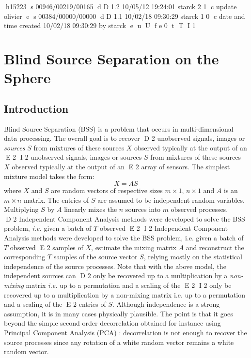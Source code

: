h15223
s 00946/00219/00165
d D 1.2 10/05/12 19:24:01 starck 2 1
c update olivier
e
s 00384/00000/00000
d D 1.1 10/02/18 09:30:29 starck 1 0
c date and time created 10/02/18 09:30:29 by starck
e
u
U
f e 0
t
T
I 1


\chapter{Blind Source Separation on the Sphere}
\label{ch_mrs_ica}

\section{Introduction}

Blind Source Separation (BSS) is a problem that occurs in multi-dimensional data processing. The overall goal is to recover 
D 2
unobserved signals, images or \emph{sources} $S$ from mixtures of these sources $X$ observed typically at the output of an 
E 2
I 2
unobserved signals, images or sources $S$ from mixtures of these sources $X$ observed typically at the output of an 
E 2
array of sensors. The simplest mixture model takes the form:
\begin{equation}\label{model0}
X = A S
\end{equation}
where $X$ and $S$ are random vectors of respective sizes $m \times 1$, $n \times 1$ and $A$ is an $m \times n$ matrix. The 
entries of $S$ are assumed to be independent random variables. Multiplying $S$ by $A$ linearly mixes the $n$ sources into 
$m$ observed processes. \\ 
   
D 2
Independent Component Analysis methods were developed to solve the BSS problem, \emph{i.e.} given a batch of $T$ observed 
E 2
I 2
Independent Component Analysis methods were developed to solve the BSS problem, i.e. given a batch of $T$ observed 
E 2
samples of $X$, estimate the mixing matrix $A$ and reconstruct the corresponding $T$ samples of the source vector $S$, relying 
mostly on the statistical independence of the source processes. Note that with the above model, the independent sources can 
D 2
only be recovered up to a multiplication by a \emph{non-mixing} matrix \emph{i.e.} up to a permutation and a scaling of the 
E 2
I 2
only be recovered up to a multiplication by a non-mixing matrix i.e. up to a permutation and a scaling of the 
E 2
entries of $S$. Although independence is a strong assumption, it is in many cases physically plausible. The point is that 
it goes beyond the simple second order decorrelation obtained for instance using Principal Component Analysis (PCA) : decorrelation 
is not enough to recover the source processes since any rotation of a white random vector remains a white random vector.\\

